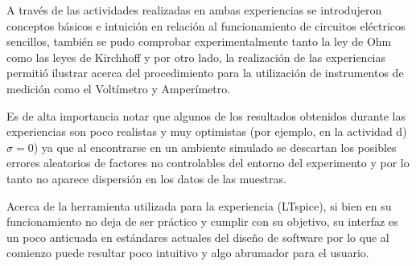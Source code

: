 \documentclass[letterpaper,11pt]{article} %
\begin{document}
A través de las actividades realizadas en ambas experiencias se introdujeron conceptos básicos e intuición en relación al funcionamiento de circuitos eléctricos sencillos, también se pudo comprobar experimentalmente tanto la ley de Ohm como las leyes de Kirchhoff y por otro lado, la realización de las experiencias permitió ilustrar acerca del procedimiento para la utilización de instrumentos de medición como el Voltímetro y Amperímetro.

Es de alta importancia notar que algunos de los resultados obtenidos durante las experiencias son poco realistas y muy optimistas (por ejemplo, en la actividad d) $\sigma = 0$) ya que al encontrarse en un ambiente simulado se descartan los posibles errores aleatorios de factores no controlables del entorno del experimento y por lo tanto no aparece dispersión en los datos de las muestras.

Acerca de la herramienta utilizada para la experiencia (LTspice), si bien en su funcionamiento no deja de ser práctico y cumplir con su objetivo, su interfaz es un poco anticuada en estándares actuales del diseño de software por lo que al comienzo puede resultar poco intuitivo y algo abrumador para el usuario.


\end{document}
